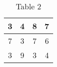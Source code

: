 \begin{table}[h!]
\centering
\caption{Table 2}
\begin{tabular}{|c|c|c|c|}
\hline
 3 & 4 & 8 & 7 \\
\hline
 7 & 3 & 7 & 6 \\
\hline
 3 & 9 & 3 & 4 \\
\hline
\end{tabular}
\label{tab: Table2}
\end{table}
